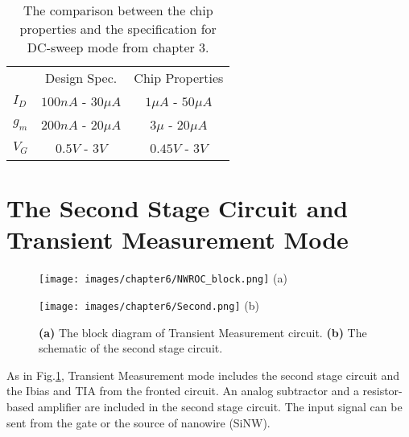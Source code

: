 \begin{table}[tbh!]
    {\fontfamily{}\fontsize{10}{14}\selectfont
    \centering
    \begin{tabular}{l|c|c}
        & Design Spec. & Chip Properties  \\
        $I_D$ & $100n A$ - $30\mu A$ & $1\mu A$ - $50\mu A$ \\
        \hline
        $g_m$ & $200n A$ - $20\mu A$& $3\mu $ - $20\mu A$\\
        \hline
        $V_G$ & $0.5V$ - $3V$ &  $0.45V$ - $3V$\\
    \end{tabular}
        \caption{The comparison between the chip properties and the specification for DC-sweep mode from chapter 3.}
        \label{tb:chip:gvtR}
    }
\end{table}

\section{The Second Stage Circuit and Transient Measurement Mode}
\begin{figure}[tb!hp]
    \begin{minipage}[t]{0.5\textwidth}
        \centering
        \texttt{[image: images/chapter6/NWROC\_block.png]}
        \raggedleft
        (a)
    \end{minipage}
    \hfill
    \begin{minipage}[t]{0.5\textwidth}
        \centering
        \texttt{[image: images/chapter6/Second.png]}
        \raggedleft
        (b)
    \end{minipage}
    \caption{\textbf{(a)} The block diagram of Transient Measurement circuit. \textbf{(b)} The schematic of the second stage circuit.}
    \label{fig:chip:ACschem}
\end{figure}

As in Fig.\ref{fig:chip:ACschem}, Transient Measurement mode includes the second stage circuit and the Ibias and TIA from the fronted circuit.
An analog subtractor and a resistor-based amplifier are included in the second stage circuit.
The input signal can be sent from the gate or the source of nanowire (SiNW).





